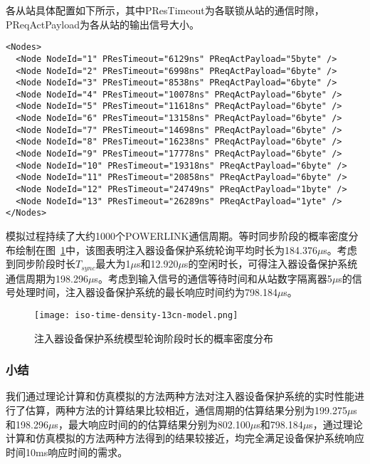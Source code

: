 各从站具体配置如下所示，其中PResTimeout为各联锁从站的通信时隙，PReqActPayload为各从站的输出信号大小。

\begin{lstlisting}
<Nodes>
  <Node NodeId="1" PResTimeout="6129ns" PReqActPayload="5byte" />
  <Node NodeId="2" PResTimeout="6998ns" PReqActPayload="6byte" />
  <Node NodeId="3" PResTimeout="8538ns" PReqActPayload="6byte" />
  <Node NodeId="4" PResTimeout="10078ns" PReqActPayload="6byte" />
  <Node NodeId="5" PResTimeout="11618ns" PReqActPayload="6byte" />
  <Node NodeId="6" PResTimeout="13158ns" PReqActPayload="6byte" />
  <Node NodeId="7" PResTimeout="14698ns" PReqActPayload="6byte" />
  <Node NodeId="8" PResTimeout="16238ns" PReqActPayload="6byte" />
  <Node NodeId="9" PResTimeout="17778ns" PReqActPayload="6byte" />
  <Node NodeId="10" PResTimeout="19318ns" PReqActPayload="6byte" />
  <Node NodeId="11" PResTimeout="20858ns" PReqActPayload="6byte" />
  <Node NodeId="12" PResTimeout="24749ns" PReqActPayload="1byte" />
  <Node NodeId="13" PResTimeout="26289ns" PReqActPayload="1yte" />
</Nodes>
\end{lstlisting}

模拟过程持续了大约1000个POWERLINK通信周期。等时同步阶段的概率密度分布绘制在图~\ref{fig:iso-time-density-13cn-model}中，该图表明注入器设备保护系统轮询平均时长为184.376$\mu$s。考虑到同步阶段时长$T_{sync}$最大为1$\mu$s和12.920$\mu$s的空闲时长，可得注入器设备保护系统通信周期为198.296$\mu$s。考虑到输入信号的通信等待时间和从站数字隔离器5$\mu$s的信号处理时间，注入器设备保护系统的最长响应时间约为798.184$\mu$s。

\begin{figure}[!htb]
  \centering
  \texttt{[image: iso-time-density-13cn-model.png]}
  \caption{注入器设备保护系统模型轮询阶段时长的概率密度分布}
  \label{fig:iso-time-density-13cn-model}
\end{figure}

\subsubsection{小结}

我们通过理论计算和仿真模拟的方法两种方法对注入器设备保护系统的实时性能进行了估算，两种方法的计算结果比较相近，通信周期的估算结果分别为199.275$\mu$s和198.296$\mu$s，最大响应时间的的估算结果分别为802.100$\mu$s和798.184$\mu$s，通过理论计算和仿真模拟的方法两种方法得到的结果较接近，均完全满足设备保护系统响应时间10ms响应时间的需求。



